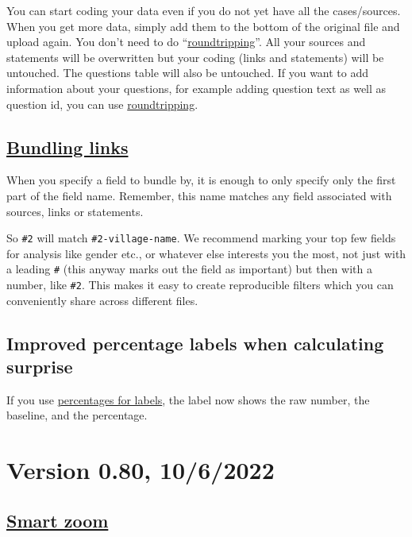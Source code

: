 \documentclass[
]{book}
\begin{document}
You can start coding your data even if you do not yet have all the cases/sources. When you get more data, simply add them to the bottom of the original file and upload again. You don't need to do ``\protect\hyperlink{xroundtripping}{roundtripping}''. All your sources and statements will be overwritten but your coding (links and statements) will be untouched. The questions table will also be untouched. If you want to add information about your questions, for example adding question text as well as question id, you can use \protect\hyperlink{xroundtripping}{roundtripping}.

\hypertarget{bundling-links}{%
\subsection{\texorpdfstring{\protect\hyperlink{bundlelinks}{Bundling links}}{Bundling links}}\label{bundling-links}}

When you specify a field to bundle by, it is enough to only specify only the first part of the field name. Remember, this name matches any field associated with sources, links or statements.

So \texttt{\#2} will match \texttt{\#2-village-name}. We recommend marking your top few fields for analysis like gender etc., or whatever else interests you the most, not just with a leading \texttt{\#} (this anyway marks out the field as important) but then with a number, like \texttt{\#2}. This makes it easy to create reproducible filters which you can conveniently share across different files.

\hypertarget{improved-percentage-labels-when-calculating-surprise}{%
\subsection{Improved percentage labels when calculating surprise}\label{improved-percentage-labels-when-calculating-surprise}}

If you use \protect\hyperlink{percent}{percentages for labels}, the label now shows the raw number, the baseline, and the percentage.

\hypertarget{version-0.80-1062022}{%
\section{Version 0.80, 10/6/2022}\label{version-0.80-1062022}}

\hypertarget{smart-zoom-1}{%
\subsection{\texorpdfstring{\protect\hyperlink{smart-zoom}{Smart zoom}}{Smart zoom}}\label{smart-zoom-1}}
\end{document}
